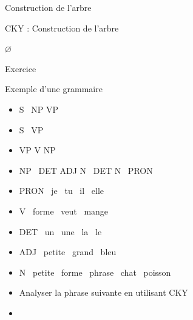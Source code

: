 \documentclass{KodeBook}
\begin{document}
Construction de l'arbre
\begin{block}{CKY : Construction de l'arbre}
	\scriptsize\vspace{-3pt}
	\begin{algorithm}[H]
		
		
		 {
			\Retour $\varnothing$ \;
		}{
			\Retour {}\;
		}
		
		
		
	\end{algorithm}
\end{block}

Exercice
\begin{exampleblock}{Exemple d'une grammaire}
	\begin{itemize}
		\item S \textrightarrow\ NP VP 
		\item S \textrightarrow\ VP 
		\item VP \textrightarrow V NP
		\item NP \textrightarrow\ DET ADJ N \textbar\ DET N \textbar\ PRON 
		\item PRON \textrightarrow\ je \textbar\ tu \textbar\ il \textbar\ elle
		\item V \textrightarrow\ forme \textbar\ veut \textbar\ mange 
		\item DET \textrightarrow\ un \textbar\ une \textbar\ la \textbar\ le
		\item ADJ \textrightarrow\ petite \textbar\ grand \textbar\ bleu 
		\item N \textrightarrow\ petite \textbar\ forme \textbar\ phrase \textbar\ chat \textbar\ poisson
	\end{itemize}
\end{exampleblock}\vspace{-6pt}

\begin{itemize}
	\item Analyser la phrase suivante en utilisant CKY 
	\item {}
\end{itemize}
\end{document}
